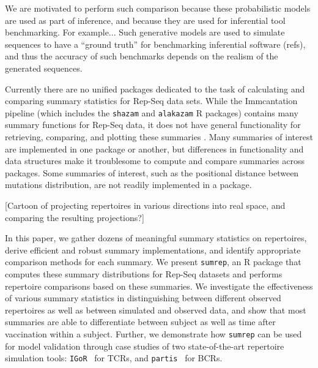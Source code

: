 \documentclass{article}
\newcommand{\partis}{\texttt{partis}}
\newcommand{\igor}{\texttt{IGoR}}
\begin{document}
We are motivated to perform such comparison because these probabilistic models are used as part of inference, and because they are used for inferential tool benchmarking.
For example...
Such generative models are used to simulate sequences to have a ``ground truth'' for benchmarking inferential software (refs), and thus the accuracy of such benchmarks depends on the realism of the generated sequences.

Currently there are no unified packages dedicated to the task of calculating and comparing summary statistics for Rep-Seq data sets.
While the Immcantation pipeline (which includes the \texttt{shazam} and \texttt{alakazam} R packages) contains many summary functions for Rep-Seq data, it does not have general functionality for retrieving, comparing, and plotting these summaries \cite{Gupta2015-iu}.
Many summaries of interest are implemented in one package or another, but differences in functionality and data structures make it troublesome to compute and compare summaries across packages.
Some summaries of interest, such as the positional distance between mutations distribution, are not readily implemented in a package.

[Cartoon of projecting repertoires in various directions into real space, and comparing the resulting projections?]

In this paper, we gather dozens of meaningful summary statistics on repertoires, derive efficient and robust summary implementations, and identify appropriate comparison methods for each summary.
We present \texttt{sumrep}, an R package that computes these summary distributions for Rep-Seq datasets and performs repertoire comparisons based on these summaries.
We investigate the effectiveness of various summary statistics in distinguishing between different observed repertoires as well as between simulated and observed data, and show that most summaries are able to differentiate between subject as well as time after vaccination within a subject.
Further, we demonstrate how \texttt{sumrep} can be used for model validation through case studies of two state-of-the-art repertoire simulation tools: \igor~\cite{Marcou2018-du} for TCRs, and \partis~\cite{Ralph2016-nw, Ralph2016-iz} for BCRs.
\end{document}
